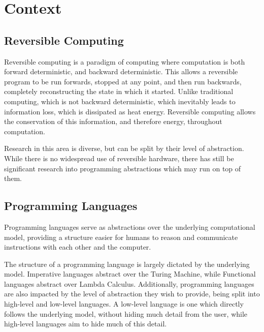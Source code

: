 \chapter{Context}


\section{Reversible Computing}


Reversible computing is a paradigm of computing where computation is both forward deterministic, and backward deterministic\cite{IntroductionToReversibleComputing}. This allows a reversible program to be run forwards, stopped at any point, and then run backwards, completely reconstructing the state in which it started.
Unlike traditional computing, which is not backward deterministic, which inevitably leads to information loss, which is dissipated as heat energy\cite{landauerIrreversibility}. Reversible computing allows the conservation of this information, and therefore energy, throughout computation\cite{Landauer}.

Research in this area is diverse, but can be split by their level of abstraction. While there is no widespread use of reversible hardware, there has still be significant research into programming abstractions which may run on top of them.

\section{Programming Languages}

Programming languages serve as abstractions over the underlying computational model, providing a structure easier for humans to reason and communicate instructions with each other and the computer. 

The structure of a programming language is largely dictated by the underlying model. Imperative languages abstract over the Turing Machine\cite{onComputableNumbers}, while Functional languages abstract over Lambda Calculus\cite{Lambda}. Additionally, programming languages are also impacted by the level of abstraction they wish to provide, being split into high-level and low-level languages. A low-level language is one which directly follows the underlying model, without hiding much detail from the user, while high-level languages aim to hide much of this detail.


